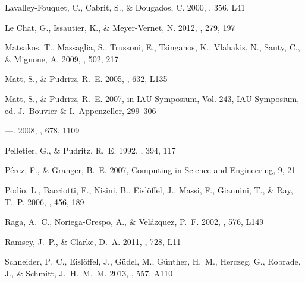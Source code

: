 \documentclass[manuscript]{aastex}
\begin{document}
\begin{thebibliography}{53}
{Lavalley-Fouquet}, C., {Cabrit}, S., \& {Dougados}, C. 2000, \aap, 356, L41

{Le Chat}, G., {Issautier}, K., \& {Meyer-Vernet}, N. 2012, \solphys, 279, 197

{Matsakos}, T., {Massaglia}, S., {Trussoni}, E., {Tsinganos}, K., {Vlahakis},
  N., {Sauty}, C., \& {Mignone}, A. 2009, \aap, 502, 217

{Matt}, S., \& {Pudritz}, R.~E. 2005, \apjl, 632, L135

{Matt}, S., \& {Pudritz}, R.~E. 2007, in IAU Symposium, Vol. 243, IAU
  Symposium, ed. J.~{Bouvier} \& I.~{Appenzeller}, 299--306

---. 2008, \apj, 678, 1109

{Pelletier}, G., \& {Pudritz}, R.~E. 1992, \apj, 394, 117

P\'erez, F., \& Granger, B.~E. 2007, Computing in Science and Engineering, 9,
  21

{Podio}, L., {Bacciotti}, F., {Nisini}, B., {Eisl{\"o}ffel}, J., {Massi}, F.,
  {Giannini}, T., \& {Ray}, T.~P. 2006, \aap, 456, 189

{Raga}, A.~C., {Noriega-Crespo}, A., \& {Vel{\'a}zquez}, P.~F. 2002, \apjl,
  576, L149

{Ramsey}, J.~P., \& {Clarke}, D.~A. 2011, \apjl, 728, L11

{Schneider}, P.~C., {Eisl{\"o}ffel}, J., {G{\"u}del}, M., {G{\"u}nther}, H.~M.,
  {Herczeg}, G., {Robrade}, J., \& {Schmitt}, J.~H.~M.~M. 2013{},
  \aap, 557, A110


\end{thebibliography}
\end{document}
